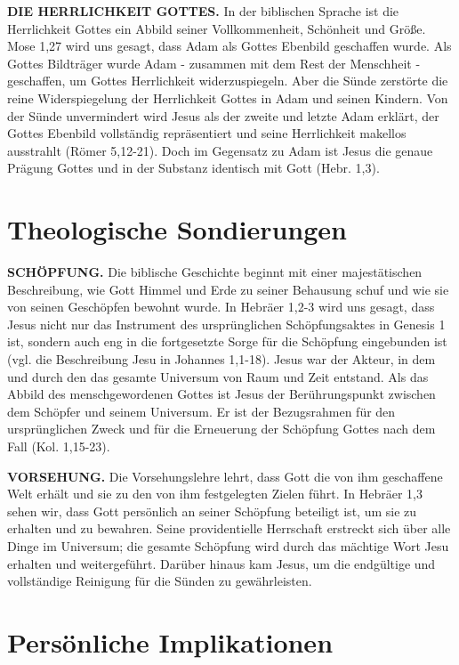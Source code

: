 \documentclass[]{book}
\begin{document}
\textbf{DIE HERRLICHKEIT GOTTES.} In der biblischen Sprache ist die
Herrlichkeit Gottes ein Abbild seiner Vollkommenheit, Schönheit und
Größe. Mose 1,27 wird uns gesagt, dass Adam als Gottes Ebenbild
geschaffen wurde. Als Gottes Bildträger wurde Adam - zusammen mit dem
Rest der Menschheit - geschaffen, um Gottes Herrlichkeit
widerzuspiegeln. Aber die Sünde zerstörte die reine Widerspiegelung der
Herrlichkeit Gottes in Adam und seinen Kindern. Von der Sünde
unvermindert wird Jesus als der zweite und letzte Adam erklärt, der
Gottes Ebenbild vollständig repräsentiert und seine Herrlichkeit
makellos ausstrahlt (Römer 5,12-21). Doch im Gegensatz zu Adam ist Jesus
die genaue Prägung Gottes und in der Substanz identisch mit Gott (Hebr.
1,3).

\section{Theologische Sondierungen}\label{theologische-sondierungen}

\textbf{SCHÖPFUNG.} Die biblische Geschichte beginnt mit einer
majestätischen Beschreibung, wie Gott Himmel und Erde zu seiner
Behausung schuf und wie sie von seinen Geschöpfen bewohnt wurde. In
Hebräer 1,2-3 wird uns gesagt, dass Jesus nicht nur das Instrument des
ursprünglichen Schöpfungsaktes in Genesis 1 ist, sondern auch eng in die
fortgesetzte Sorge für die Schöpfung eingebunden ist (vgl. die
Beschreibung Jesu in Johannes 1,1-18). Jesus war der Akteur, in dem und
durch den das gesamte Universum von Raum und Zeit entstand. Als das
Abbild des menschgewordenen Gottes ist Jesus der Berührungspunkt
zwischen dem Schöpfer und seinem Universum. Er ist der Bezugsrahmen für
den ursprünglichen Zweck und für die Erneuerung der Schöpfung Gottes
nach dem Fall (Kol. 1,15-23).

\textbf{VORSEHUNG.} Die Vorsehungslehre lehrt, dass Gott die von ihm
geschaffene Welt erhält und sie zu den von ihm festgelegten Zielen
führt. In Hebräer 1,3 sehen wir, dass Gott persönlich an seiner
Schöpfung beteiligt ist, um sie zu erhalten und zu bewahren. Seine
providentielle Herrschaft erstreckt sich über alle Dinge im Universum;
die gesamte Schöpfung wird durch das mächtige Wort Jesu erhalten und
weitergeführt. Darüber hinaus kam Jesus, um die endgültige und
vollständige Reinigung für die Sünden zu gewährleisten.

\section{Persönliche Implikationen}\label{persuxf6nliche-implikationen}
\end{document}
